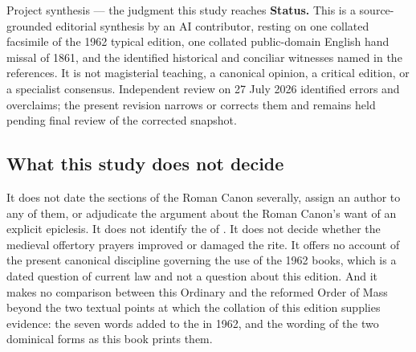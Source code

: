 \begin{studybox}{Project synthesis --- the judgment this study reaches}
\smallskip
\textbf{Status.} This is a source-grounded editorial synthesis by an AI
contributor, resting on one collated facsimile of the 1962 typical edition, one
collated public-domain English hand missal of 1861, and the identified
historical and conciliar witnesses named in the references. It is not
magisterial teaching, a canonical opinion, a critical edition, or a specialist
consensus. Independent review on 27 July 2026 identified errors and overclaims;
the present revision narrows or corrects them and remains held pending final
review of the corrected snapshot.
\end{studybox}

\subsection*{What this study does not decide}

It does not date the sections of the Roman Canon severally, assign an author to
any of them, or adjudicate the argument about the Roman Canon's want of an
explicit epiclesis. It does not identify the  of
. It does not decide whether the medieval offertory prayers
improved or damaged the rite. It offers no account of the present canonical
discipline governing the use of the 1962 books, which is a dated question of
current law and not a question about this edition. And it makes no comparison
between this Ordinary and the reformed Order of Mass beyond the two textual
points at which the collation of this edition supplies evidence: the seven words
added to the  in 1962, and the wording of the two
dominical forms as this book prints them.
